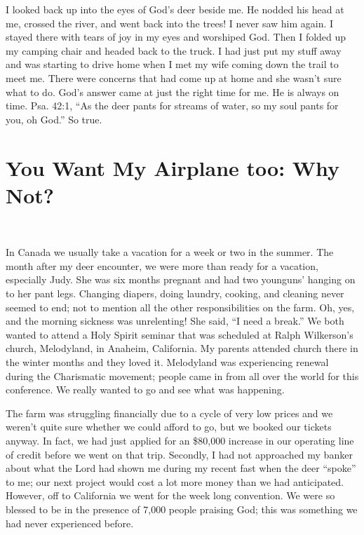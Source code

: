 \documentclass[twoside, 12pt]{book}
\begin{document}
I looked back up into the eyes of God's deer beside me. He nodded his head at me, crossed the river, and went back into the trees! I never saw him again. I stayed there with tears of joy in my eyes and worshiped God. Then I folded up my camping chair and headed back to the truck. I had just put my stuff away and was starting to drive home when I met my wife coming down the trail to meet me. There were concerns that had come up at home and she wasn't sure what to do. God's answer came at just the right time for me. He is always on time. Psa. 42:1, “As the deer pants for streams of water, so my soul pants for you, oh God.” So true.

\section{You Want My Airplane too: Why Not?}
\

In Canada we usually take a  vacation for a week or two in the summer. The month after my deer encounter, we were more than ready for a vacation, especially Judy. She was six months pregnant and had two younguns' hanging on to her pant legs. Changing diapers, doing laundry, cooking, and cleaning never seemed to end; not to mention all the other responsibilities on the farm. Oh, yes, and the morning sickness was unrelenting! She said, “I need a break.” We both wanted to attend a Holy Spirit seminar that was scheduled at Ralph Wilkerson's church, Melodyland, in Anaheim, California. My parents attended church there in the winter months and they loved it. Melodyland was experiencing renewal during the Charismatic movement; people came in from all over the world for this conference. We really wanted to go and see what was happening. 

The farm was struggling financially due to a cycle of very low prices and we weren't quite sure whether we could afford to go, but we booked our tickets anyway. In fact, we had just applied for an \$80,000 increase in our operating line of credit before we went on that trip. Secondly, I had not approached my banker about what the Lord had shown me during my recent fast when the deer “spoke” to me; our next project would cost a lot more money than we had anticipated. However, off to California we went for the week long convention. We were so blessed to be in the presence of 7,000 people praising God; this was something we had never experienced before.
\end{document}
